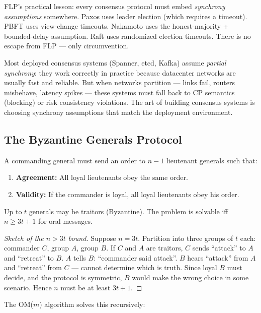 FLP's practical lesson: every consensus protocol must embed \emph{synchrony assumptions} somewhere. Paxos uses leader election (which requires a timeout). PBFT uses view-change timeouts. Nakamoto uses the honest-majority + bounded-delay assumption. Raft uses randomized election timeouts. There is no escape from FLP — only circumvention.

Most deployed consensus systems (Spanner, etcd, Kafka) assume \emph{partial synchrony}: they work correctly in practice because datacenter networks are usually fast and reliable. But when networks partition — links fail, routers misbehave, latency spikes — these systems must fall back to CP semantics (blocking) or risk consistency violations. The art of building consensus systems is choosing synchrony assumptions that match the deployment environment.

\subsection{The Byzantine Generals Protocol}
\label{sec:consensus:byzantine}

\begin{definition}
A commanding general must send an order to $n-1$ lieutenant generals such that:
\begin{enumerate}
\item \textbf{Agreement:} All loyal lieutenants obey the same order.
\item \textbf{Validity:} If the commander is loyal, all loyal lieutenants obey his order.
\end{enumerate}
Up to $t$ generals may be traitors (Byzantine). The problem is solvable iff $n \ge 3t+1$ for oral messages.
\end{definition}

\begin{proof}[Sketch of the $n > 3t$ bound]
Suppose $n = 3t$. Partition into three groups of $t$ each: commander $C$, group $A$, group $B$. If $C$ and $A$ are traitors, $C$ sends ``attack'' to $A$ and ``retreat'' to $B$. $A$ tells $B$: ``commander said attack''. $B$ hears ``attack'' from $A$ and ``retreat'' from $C$ — cannot determine which is truth. Since loyal $B$ must decide, and the protocol is symmetric, $B$ would make the wrong choice in some scenario. Hence $n$ must be at least $3t+1$.
\end{proof}

The OM($m$) algorithm solves this recursively:

